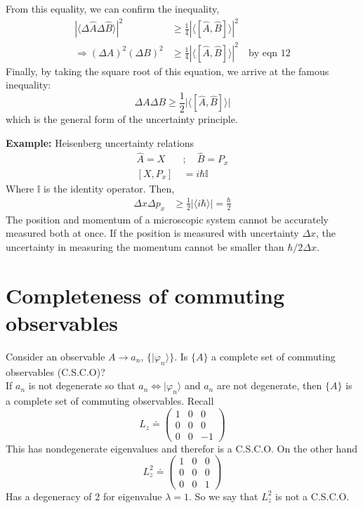 \documentclass[a4paper, 11pt]{article}
\newcommand{\ket}[1]{|#1\rangle}
\newcommand{\expect}[1]{\langle #1 \rangle}
\newenvironment{solution}{%
	\begin{list}{}{%
			\setlength{\topsep}{0pt}%
			\setlength{\leftmargin}{1.5cm}%
			\setlength{\rightmargin}{1.5cm}%
			\setlength{\listparindent}{\parindent}%
			\setlength{\itemindent}{\parindent}%
			\setlength{\parsep}{\parskip}%
		}%
		\item[]}{\end{list}}
\begin{document}
	From this equality, we can confirm the inequality, 
		\begin{align*}
			|\expect{\Delta\hat{A}\Delta\hat{B}}|^2 &\geq \frac{1}{4}|\expect{[\hat{A},\hat{B}]}|^2 \\ 
			\Rightarrow (\Delta A)^2(\Delta B)^2 &\geq \frac{1}{4}|\expect{[\hat{A},\hat{B}]}|^2 \quad \text{by eqn 12} 
		\end{align*}
	Finally, by taking the square root of this equation, we arrive at the famous inequality:
		\begin{equation}
			\Delta A \Delta B \geq \frac{1}{2}\Big| \expect{[\hat{A}, \hat{B}]}\Big|
		\end{equation}
	which is the general form of the uncertainty principle.
		\begin{solution}
			\noindent\textbf{Example:} Heisenberg uncertainty relations
				\begin{align}
					\hat{A} = X \quad&;\quad \hat{B}=P_x \\ 
					[X, P_x] &= i\hbar\mathbb{I}
				\end{align}
			Where $\mathbb{I}$ is the identity operator. Then, 
				\begin{align*}
					\Delta x \Delta p_x &\geq \frac{1}{2}|\expect{i\hbar}| = \frac{\hbar}{2}
				\end{align*} 
			The position and momentum of a microscopic system cannot be accurately measured both at once. If the position is measured with uncertainty $\Delta x$, the uncertainty in measuring the momentum cannot be smaller than $\hbar/2\Delta x$. 
		\end{solution}
	
	
\section*{Completeness of commuting observables}
	\noindent Consider an observable $A \rightarrow a_n$, $ \{\ket{\varphi_n}\}$. Is $\{A\}$ a complete set of commuting observables (C.S.C.O)? \\ 
	
	\noindent If $a_n$ is not degenerate so that $a_n \iff \ket{\varphi_n}$ and $a_n$ are not degenerate, then $\{A\}$ is a complete set of commuting observables. Recall 
		\begin{equation*}
			L_z \doteq \begin{pmatrix}
				1 & 0 & 0 \\ 
				0 & 0 & 0 \\ 
				0 & 0 & -1 
			\end{pmatrix}
		\end{equation*}
	This has nondegenerate eigenvalues and therefor is a C.S.C.O. On the other hand 
		\begin{equation*}
			L_z^2 \doteq \begin{pmatrix}
			1 & 0 & 0 \\ 
			0 & 0 & 0 \\ 
			0 & 0 & 1 
			\end{pmatrix}
		\end{equation*}
	Has a degeneracy of 2 for eigenvalue $\lambda=1$. So we say that $L_z^2$ is not a C.S.C.O. \\ 
	
\end{document}
